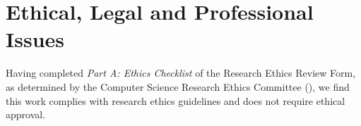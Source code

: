 \section{Ethical, Legal and Professional Issues}
Having completed \textit{Part A: Ethics Checklist} of the Research Ethics Review Form, as determined by the Computer Science Research Ethics Committee (\cite{CSREC:2020}), we find this work complies with research ethics guidelines and does not require ethical approval.



